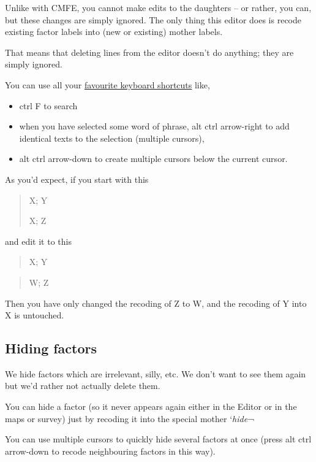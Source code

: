 \documentclass[
]{book}
\providecommand{\tightlist}{%
  \setlength{\itemsep}{0pt}\setlength{\parskip}{0pt}}
\begin{document}
Unlike with CMFE, you cannot make edits to the daughters -- or rather, you can, but these changes are simply ignored. The only thing this editor does is recode existing factor labels into (new or existing) mother labels.

That means that deleting lines from the editor doesn't do anything; they are simply ignored.

You can use all your \protect\hyperlink{xkeyboard}{favourite keyboard shortcuts} like,

\begin{itemize}
\tightlist
\item
  ctrl F to search
\item
  when you have selected some word of phrase, alt ctrl arrow-right to add identical texts to the selection (multiple cursors),
\item
  alt ctrl arrow-down to create multiple cursors below the current cursor.
\end{itemize}

As you'd expect, if you start with this

\begin{quote}
X; Y

X; Z
\end{quote}

and edit it to this

\begin{quote}
X; Y
\end{quote}

\begin{quote}
W; Z
\end{quote}

Then you have only changed the recoding of Z to W, and the recoding of Y into X is untouched.

\hypertarget{hiding-factors}{%
\subsection{Hiding factors}\label{hiding-factors}}

We hide factors which are irrelevant, silly, etc. We don't want to see them again but we'd rather not actually delete them.

You can hide a factor (so it never appears again either in the Editor or in the maps or survey) just by recoding it into the special mother `\emph{hide}¬

You can use multiple cursors to quickly hide several factors at once (press alt ctrl arrow-down to recode neighbouring factors in this way).
\end{document}
